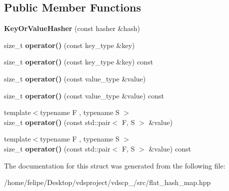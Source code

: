 \subsection*{Public Member Functions}
\begin{DoxyCompactItemize}
\item 
{\bfseries Key\+Or\+Value\+Hasher} (const hasher \&hash)\label{structska_1_1detailv3_1_1KeyOrValueHasher_a4a39b08d7dae78f6d8a64e81edf6224d}

\item 
size\+\_\+t {\bfseries operator()} (const key\+\_\+type \&key)\label{structska_1_1detailv3_1_1KeyOrValueHasher_aa00b948e4a4e0c8ec76710b145a8d3f3}

\item 
size\+\_\+t {\bfseries operator()} (const key\+\_\+type \&key) const \label{structska_1_1detailv3_1_1KeyOrValueHasher_a0992593aec2cb1737e67380b4b2010fa}

\item 
size\+\_\+t {\bfseries operator()} (const value\+\_\+type \&value)\label{structska_1_1detailv3_1_1KeyOrValueHasher_a04c97c4e8eefda2592d030775bacfc5b}

\item 
size\+\_\+t {\bfseries operator()} (const value\+\_\+type \&value) const \label{structska_1_1detailv3_1_1KeyOrValueHasher_ae69dbe0f39291f853aa10fe75ec04875}

\item 
{\footnotesize template$<$typename F , typename S $>$ }\\size\+\_\+t {\bfseries operator()} (const std\+::pair$<$ F, S $>$ \&value)\label{structska_1_1detailv3_1_1KeyOrValueHasher_a5473ea70e3e1ab195c5cc092de851e28}

\item 
{\footnotesize template$<$typename F , typename S $>$ }\\size\+\_\+t {\bfseries operator()} (const std\+::pair$<$ F, S $>$ \&value) const \label{structska_1_1detailv3_1_1KeyOrValueHasher_adb3364a50047fa36d9b7904321f68155}

\end{DoxyCompactItemize}


The documentation for this struct was generated from the following file\+:\begin{DoxyCompactItemize}
\item 
/home/felipe/\+Desktop/vdsproject/vdscp\+\_/src/flat\+\_\+hash\+\_\+map.\+hpp\end{DoxyCompactItemize}
